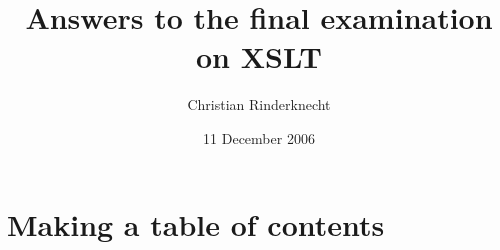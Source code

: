\documentclass[11pt,a4paper]{article}
\title{Answers to the final examination on XSLT}
\author{Christian Rinderknecht}
\date{11 December 2006}
\begin{document}
\maketitle

\section{Making a table of contents}



\end{document}
